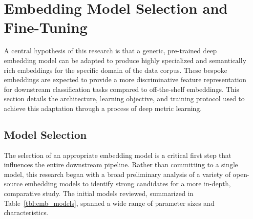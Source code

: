 \section{Embedding Model Selection and Fine-Tuning}\label{ch:3.3}
A central hypothesis of this research is that a generic, pre-trained deep embedding model can be adapted to produce highly specialized and semantically rich embeddings for the specific domain of the data corpus. These bespoke embeddings are expected to provide a more discriminative feature representation for downstream classification tasks compared to off-the-shelf embeddings. This section details the architecture, learning objective, and training protocol used to achieve this adaptation through a process of deep metric learning.

\subsection{Model Selection}
The selection of an appropriate embedding model is a critical first step that influences the entire downstream pipeline. Rather than committing to a single model, this research began with a broad preliminary analysis of a variety of open-source embedding models to identify strong candidates for a more in-depth, comparative study. The initial models reviewed, summarized in Table~\ref{tbl:emb_models}, spanned a wide range of parameter sizes and characteristics.
